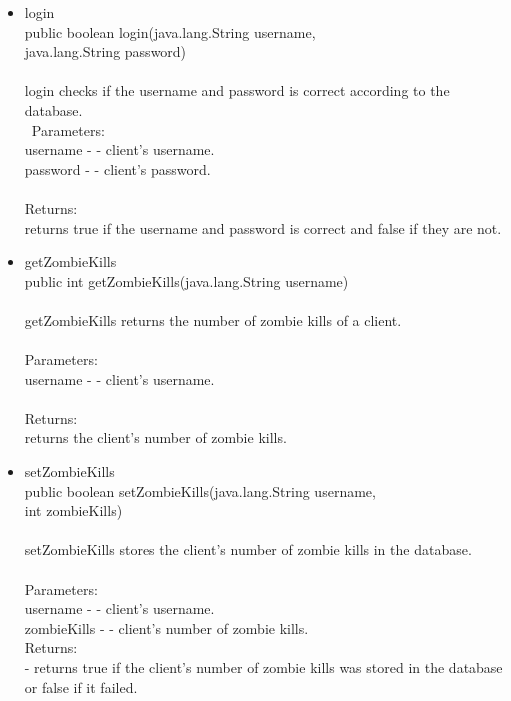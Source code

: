 \documentclass[letterpaper]{article}
\begin{document}
\begin{itemize}
\begin{itemize}
													\item	login \\
															public boolean login(java.lang.String username, \\
						            java.lang.String password) \\ \\
															login checks if the username and password is correct according to the database. \\ \
															Parameters: \\
															username - - client's username. \\
															password - - client's password. \\ \\
															Returns: \\
															returns true if the username and password is correct and false if they are not.
													\item	getZombieKills \\
															public int getZombieKills(java.lang.String username) \\ \\
															getZombieKills returns the number of zombie kills of a client. \\ \\
															Parameters: \\
															username - - client's username. \\ \\
															Returns:  \\
															returns the client's number of zombie kills.
													\item	setZombieKills \\
															public boolean setZombieKills(java.lang.String username, \\
						                     int zombieKills) \\ \\
															setZombieKills stores the client's number of zombie kills in the database. \\ \\
															Parameters: \\
															username - - client's username. \\
															zombieKills - - client's number of zombie kills. \\
															Returns: \\
															- returns true if the client's number of zombie kills was stored in the database or false if it failed.

\end{itemize}
\end{itemize}
\end{document}
